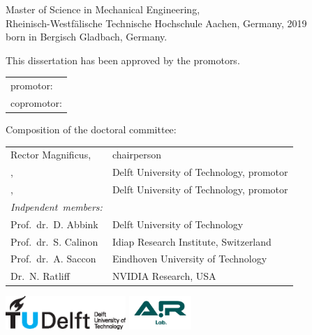 \begin{titlepage}
\begin{center}
\bigskip
\bigskip

Master of Science in Mechanical Engineering, \\
Rheinisch-Westfälische Technische Hochschule Aachen,
Germany, 2019 \\
born in Bergisch Gladbach, Germany.

\vspace*{2\bigskipamount}

\end{center}

\clearpage
\thispagestyle{empty}

\noindent This dissertation has been approved by the
promotors.

\medskip\noindent
\begin{tabular}{l}
    promotor: \promotor{} \\
    copromotor: \copromotor{}
\end{tabular}

\bigskip
\noindent Composition of the doctoral committee:

\medskip\noindent
\begin{tabular}{p{4cm}l}
    Rector Magnificus, & chairperson\\
    \promotor{}, & Delft University of Technology, promotor \\
    \copromotor{}, & Delft University of Technology, promotor \\

    \medskip
    \mbox{\emph{Indpendent members:}} & \\

    Prof.\ dr.\ D. Abbink & Delft University of Technology \\
    Prof.\ dr.\ S. Calinon & Idiap Research Institute,  Switzerland \\
    Prof.\ dr.\ A. Saccon & Eindhoven University of Technology \\
    Dr.\ N. Ratliff & NVIDIA Research, USA \\

\end{tabular}

\vfill
\begin{center}
    \includegraphics[height=0.5in]{logos/tudelft}
    \hspace{2em}
    \includegraphics[height=0.5in]{logos/airlab.png} \\
\end{center}
\vfill


\end{titlepage}
